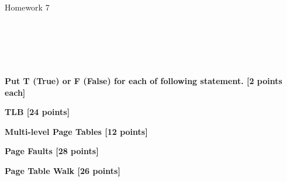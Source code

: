 \documentclass[addpoints, 12pt, answers]{exam}
\begin{document}
\begin{CJK*}{UTF8}{gbsn}
    \begin{center}

        {\centering \Large Homework 7\\\vspace{.75cm}}

        \vspace{0.1cm}
        \\[0.6cm]
        \\[0.6cm]
        \\[0.6cm]
        \\[0.5cm]

    \end{center}
\end{CJK*}

\begin{questions}
    \question[10] \textbf{Put T (True) or F (False) for each of following statement. [2 points each]}
    
    \newpage
    \question[24] \textbf{TLB [24 points]}
    
    \clearpage
    \question[12] \textbf{Multi-level Page Tables [12 points]}
    
    \newpage
    \question[28] \textbf{Page Faults [28 points]}
    
    \newpage
    \question[26] \textbf{Page Table Walk [26 points]}
    
    \newpage

\end{questions}
\end{document}
